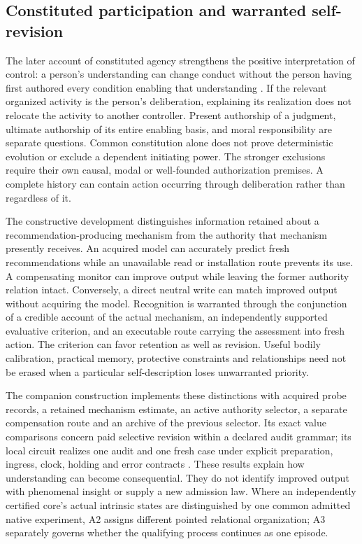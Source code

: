 \subsection{Constituted participation and warranted self-revision}
The later account of constituted agency strengthens the positive interpretation of control: a person's understanding can change conduct without the person having first authored every condition enabling that understanding \cite[Sections~2, 9--11]{RodgersConstitutedAgency}. If the relevant organized activity is the person's deliberation, explaining its realization does not relocate the activity to another controller. Present authorship of a judgment, ultimate authorship of its entire enabling basis, and moral responsibility are separate questions. Common constitution alone does not prove deterministic evolution or exclude a dependent initiating power. The stronger exclusions require their own causal, modal or well-founded authorization premises. A complete history can contain action occurring through deliberation rather than regardless of it.

The constructive development distinguishes information retained about a recommendation-producing mechanism from the authority that mechanism presently receives. An acquired model can accurately predict fresh recommendations while an unavailable read or installation route prevents its use. A compensating monitor can improve output while leaving the former authority relation intact. Conversely, a direct neutral write can match improved output without acquiring the model. Recognition is warranted through the conjunction of a credible account of the actual mechanism, an independently supported evaluative criterion, and an executable route carrying the assessment into fresh action. The criterion can favor retention as well as revision. Useful bodily calibration, practical memory, protective constraints and relationships need not be erased when a particular self-description loses unwarranted priority.

The companion construction implements these distinctions with acquired probe records, a retained mechanism estimate, an active authority selector, a separate compensation route and an archive of the previous selector. Its exact value comparisons concern paid selective revision within a declared audit grammar; its local circuit realizes one audit and one fresh case under explicit preparation, ingress, clock, holding and error contracts \cite[Sections~11--15]{RodgersConstitutedAgency}. These results explain how understanding can become consequential. They do not identify improved output with phenomenal insight or supply a new admission law. Where an independently certified core's actual intrinsic states are distinguished by one common admitted native experiment, A2 assigns different pointed relational organization; A3 separately governs whether the qualifying process continues as one episode.

